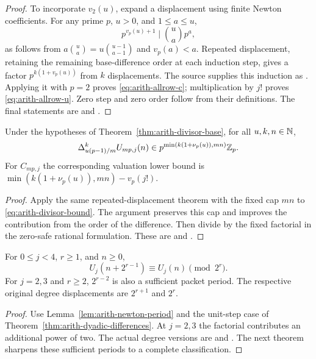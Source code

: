 \begin{proof}
To incorporate $v_2(u)$, expand a displacement using finite Newton
coefficients.  For any prime $p$, $u>0$, and $1\le a\le u$,
\[
 p^{v_p(u)+1}\mid\binom ua p^a,
\]
as follows from $a\binom ua=u\binom{u-1}{a-1}$ and $v_p(a)<a$.
Repeated displacement, retaining the remaining base-difference order
at each induction step, gives a factor $p^{k(1+v_p(u))}$ from $k$
displacements.  The source supplies this induction as
.
Applying it with $p=2$ proves \eqref{eq:arith-allrow-c}; multiplication
by $j!$ proves \eqref{eq:arith-allrow-u}.  Zero step and zero order follow
from their definitions.  The final statements are
and
.
\end{proof}

\begin{corollary}\label{cor:arith-amplified}
Under the hypotheses of Theorem~\ref{thm:arith-divisor-base}, for all
$u,k,n\in\mathbb N$,
\[
 \Delta_{u(p-1)/m}^{k}U_{mp,j}(n)
       \in p^{\min(k(1+\nu_p(u)),mn)}\mathbb Z_p.
\]
For $C_{mp,j}$ the corresponding valuation lower bound is
$\min(k(1+\nu_p(u)),mn)-v_p(j!)$.
\end{corollary}

\begin{proof}
Apply the same repeated-displacement theorem with the fixed cap $mn$ to
\eqref{eq:arith-divisor-bound}.  The argument preserves this cap and
improves the contribution from the order of the difference.
Then divide by the fixed factorial in the zero-safe rational formulation.
These are
and
.
\end{proof}

\begin{corollary}\label{cor:arith-allrow-period}
For $0\le j<4$, $r\ge1$, and $n\ge0$,
\[
 U_j(n+2^{r-1})\equiv U_j(n)\pmod{2^r}.
\]
For $j=2,3$ and $r\ge2$, $2^{r-2}$ is also a sufficient packet period.
The respective original degree displacements are $2^{r+1}$ and $2^r$.
\end{corollary}

\begin{proof}
Use Lemma~\ref{lem:arith-newton-period} and the unit-step case of
Theorem~\ref{thm:arith-dyadic-differences}.  At $j=2,3$ the factorial
contributes an additional power of two.  The actual degree versions are
and
.
The next theorem sharpens these sufficient periods to a complete
classification.
\end{proof}

